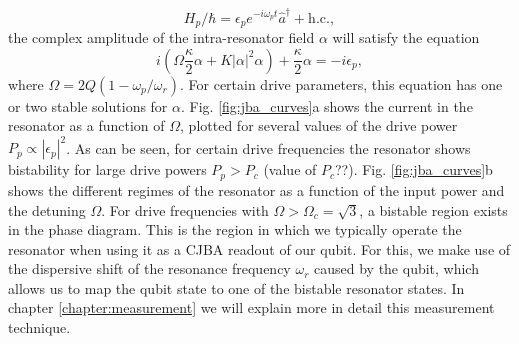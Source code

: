 %
\begin{equation}
H_p/\hbar = \epsilon_p e^{-i\omega_p t}\hat{a}^\dagger+\mathrm{h.c.},
\end{equation}
%
the complex amplitude of the intra-resonator field $\alpha$ will satisfy the equation 
%
\begin{equation}
i\left(\Omega\frac{\kappa}{2}\alpha+K|\alpha|^2\alpha\right)+\frac{\kappa}{2}\alpha = -i\epsilon_p,
\end{equation}
%
where $\Omega = 2Q\left(1-\omega_p/\omega_r\right)$. For certain drive parameters, this equation has one or two stable solutions for $\alpha$. Fig. \ref{fig:jba_curves}a shows the current in the resonator as a function of $\Omega$, plotted for several values of the drive power $P_p\propto |\epsilon_p|^2$. As can be seen, for certain drive frequencies the resonator shows bistability for large drive powers $P_p>P_c$ (value of $P_c$??). Fig. \ref{fig:jba_curves}b shows the different regimes of the resonator as a function of the input power and the detuning $\Omega$.  For drive frequencies with $\Omega > \Omega_c = \sqrt{3}$, a bistable region exists in the phase diagram. This is the region in which we typically operate the resonator when using it as a CJBA readout of our qubit. For this, we make use of the dispersive shift of the resonance frequency $\omega_r$ caused by the qubit, which allows us to map the qubit state to one of the bistable resonator states. In chapter \ref{chapter:measurement} we will explain more in detail this measurement technique.

%
%
 
